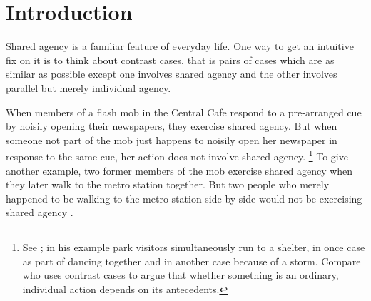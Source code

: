 \documentclass[12pt,\papersize]{extarticle}
\begin{document}
%
%
%
%




\section{Introduction}
Shared agency is a familiar feature of everyday life.
One way to get an intuitive fix on it is to think about contrast cases, that is pairs of cases which are as similar as possible except one involves shared agency and the other involves parallel but merely individual agency.

When members of a flash mob in the Central Cafe respond to a pre-arranged cue by noisily opening their newspapers, they exercise shared agency. 
But when someone not part of the mob just happens to noisily open her newspaper in response to the same cue, her action does not involve shared agency.%
\footnote{
See \citet{Searle:1990em}; in his example park visitors simultaneously run to a shelter, in once case as part of dancing together and in another case because of a storm. 
Compare \citet{Pears:1971fk} who uses contrast cases to argue that whether something is an ordinary, individual action depends on its antecedents. 
}
To give another example, 
 two former members of the mob exercise shared agency when they 
   later walk to the metro station together. 
But two people who merely happened to be walking to the metro station side by side would not be exercising shared agency \citep{gilbert_walking_1990}. 
\end{document}
